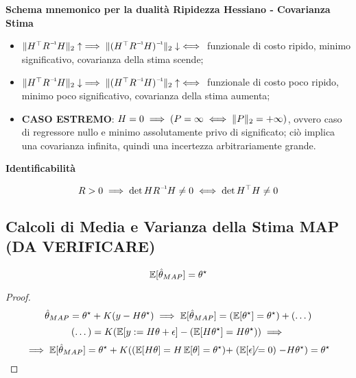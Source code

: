 \begin{snpt}{\textbf{Schema mnemonico per la dualità Ripidezza Hessiano - Covarianza Stima}}

\begin{itemize}

\item{$\norma{H^\top\inv{R}H}_2\uparrow \implies \norma{\inv{(H^\top\inv{R}H)}}_2\downarrow \iff$} funzionale di costo ripido, minimo significativo, covarianza della stima scende;
\item{$\norma{H^\top\inv{R}H}_2\downarrow \implies \norma{\inv{(H^\top\inv{R}H)}}_2\uparrow \iff$} funzionale di costo poco ripido, minimo poco significativo, covarianza della stima aumenta;
\item{\textbf{CASO ESTREMO}}: $H=0\implies (P=\infty\iff\lVert P\rVert_2=+\infty)$, ovvero caso di regressore nullo e minimo assolutamente privo di significato; ciò implica una covarianza infinita, quindi una incertezza arbitrariamente grande.

\end{itemize}

\end{snpt}

\begin{prop}{\textbf{Identificabilità}}

\[
	R > 0 \implies \det{H\inv{R}H}\neq 0\iff \det{H^\top H}\neq 0
\]

\end{prop}

\subsection{Calcoli di Media e Varianza della Stima MAP (DA VERIFICARE)}

\begin{prop}

\[
	\operatorname{\mathbb{E}}[\hat{\theta}_{MAP}]=\theta^\star
\]

\end{prop}

\begin{proof}

\[
	\hat{\theta}_{MAP} = \theta^\star + K(y-H\theta^\star) \implies \operatorname{\mathbb{E}}[\hat{\theta}_{MAP}] = (\operatorname{\mathbb{E}}[\theta^\star]=\theta^\star) + (\dots)
\]
\[
	(\dots) = K(\operatorname{\mathbb{E}}[y:=H\theta+\epsilon] - (\operatorname{\mathbb{E}}[H\theta^\star]=H\theta^\star)) \implies
\]
\[
	\implies \E[\hat{\theta}_{MAP}] = \theta^\star + K((\E[H\theta]=H\E[\theta]=\theta^\star) + \centernot{(\E[\epsilon]=0)} - H\theta^\star) = \theta^\star
\]

\end{proof}

